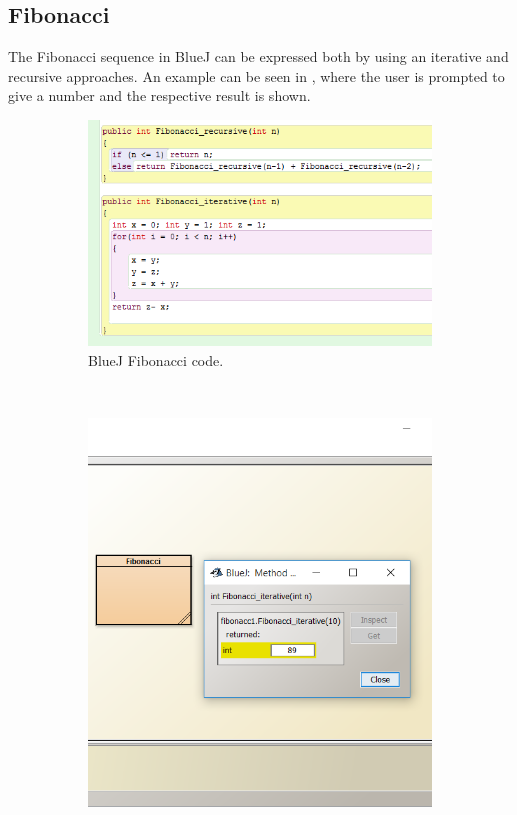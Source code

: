 \subsection{Fibonacci}
The Fibonacci sequence in BlueJ can be expressed both by using an iterative and recursive approaches. An example can be seen in , where the user is prompted to give a number and the respective result is shown.

\begin{figure}[!h]
  \centering
    \begin{subfigure}[b]{0.45\textwidth}
    \begin{center}
      \includegraphics[scale=0.7]{./pics/bluej_fibo_code}
      \caption{BlueJ Fibonacci code.}
      \label{fig:bluej_fibo_code}
    \end{center}
    \end{subfigure}
    ~
    \begin{subfigure}[b]{0.45\textwidth}
    \begin{center}
      \includegraphics[scale=0.6]{./pics/bluej_fibo_code2}

\end{center}
\end{subfigure}
\end{figure}
